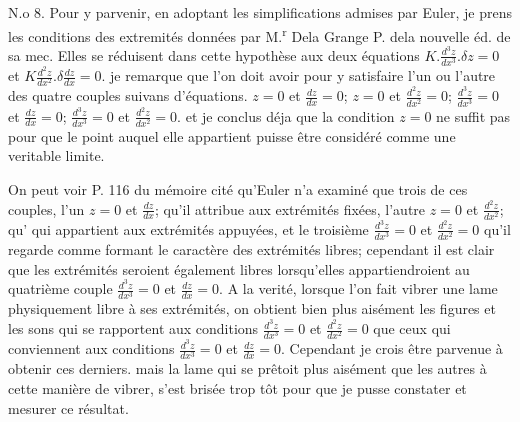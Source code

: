 \documentclass[11pt,a4paper]{article}
\begin{document}
N.o 8. Pour y parvenir, en adoptant les simplifications admises par Euler,
je prens les conditions des extremités données par M.\textsuperscript{r} Dela Grange
P.  dela nouvelle éd. de sa mec. Elles se réduisent dans cette hypothèse
aux deux équations $K.\frac{d^3z}{dx^3}.\delta z = 0$ et $K\frac{d^2z}{dx^2}.\delta\frac{dz}{dx} = 0$. je remarque que
l'on doit avoir pour y satisfaire l'un ou l'autre des quatre
couples suivans d'équations. $z = 0$ et $\frac{dz}{dx} = 0$; $z = 0$ et $\frac{d^2z}{dx^2} = 0$;
$\frac{d^3z}{dx^3} = 0$ et $\frac{dz}{dx} = 0$; $\frac{d^3z}{dx^3} = 0$ et $\frac{d^2z}{dx^2} = 0$. et je conclus déja que
la condition $z = 0$ ne suffit pas pour que le point auquel
elle appartient puisse être considéré comme une veritable limite.

On peut voir P. 116 du mémoire cité qu'Euler n'a examiné que
trois de ces couples, l'un $z = 0$ et $\frac{dz}{dx}$; qu'il attribue aux
extrémités fixées, l'autre $z = 0$ et $\frac{d^2z}{dx^2}$; qu'
qui appartient aux extrémités appuyées, et le troisième
$\frac{d^3z}{dx^3} = 0$ et $\frac{d^2z}{dx^2} = 0$ qu'il regarde comme formant le caractère
des extrémités libres; cependant il est clair que les extrémités
seroient également libres lorsqu'elles appartiendroient au quatrième
couple $\frac{d^3z}{dx^3} = 0$ et $\frac{dz}{dx} = 0$. A la verité, lorsque l'on fait
vibrer une lame physiquement libre à ses extrémités, on obtient bien
plus aisément les figures et les sons qui se rapportent aux
conditions $\frac{d^3z}{dx^3} = 0$ et $\frac{d^2z}{dx^2} = 0$ que ceux qui conviennent aux
conditions $\frac{d^3z}{dx^3} = 0$ et $\frac{dz}{dx} = 0$. Cependant je crois être parvenue
à obtenir ces derniers. mais la lame qui se prêtoit plus
aisément que les autres à cette manière de vibrer, s'est
brisée trop tôt pour que je pusse  constater et mesurer
ce résultat.
\end{document}
